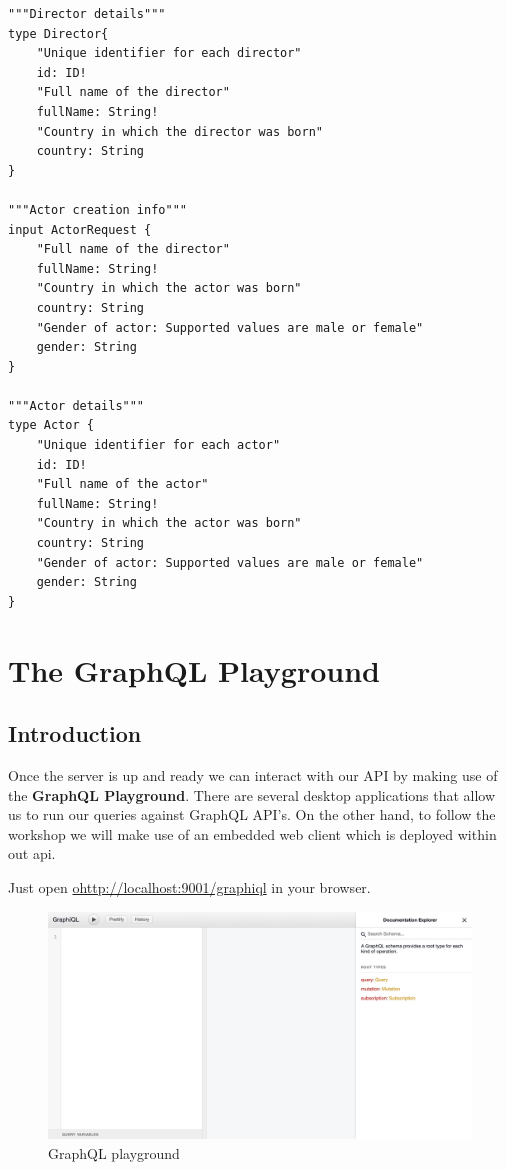 \documentclass[]{book}
\begin{document}
\begin{verbatim}
"""Director details"""
type Director{
    "Unique identifier for each director"
    id: ID!
    "Full name of the director"
    fullName: String!
    "Country in which the director was born"
    country: String
}

"""Actor creation info"""
input ActorRequest {
    "Full name of the director"
    fullName: String!
    "Country in which the actor was born"
    country: String
    "Gender of actor: Supported values are male or female"
    gender: String
}

"""Actor details"""
type Actor {
    "Unique identifier for each actor"
    id: ID!
    "Full name of the actor"
    fullName: String!
    "Country in which the actor was born"
    country: String
    "Gender of actor: Supported values are male or female"
    gender: String
}
\end{verbatim}

\chapter{The GraphQL Playground}\label{the-graphql-playground}

\section{Introduction}\label{introduction}

Once the server is up and ready we can interact with our API by making
use of the \textbf{GraphQL Playground}. There are several desktop
applications that allow us to run our queries against GraphQL API's. On
the other hand, to follow the workshop we will make use of an embedded
web client which is deployed within out api.

Just open
\href{http://localhost:9001/graphiql}{ohttp://localhost:9001/graphiql}
in your browser.

\begin{figure}
\centering
\includegraphics{assets/graphiql.png}
\caption{GraphQL playground}
\end{figure}
\end{document}
